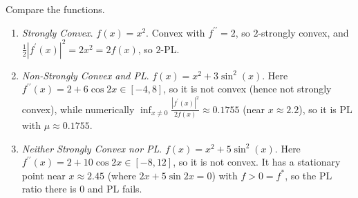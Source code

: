	\begin{example}
	  \label{ex:pl-vs-strongly-convex} 
		Compare the functions. 
		\begin{enumerate}
		  \item \textit{Strongly Convex}. $f(x) = x^2$. Convex with $f^{\prime\prime} = 2$, so $2$-strongly convex, and $\frac{1}{2}|f^\prime(x)|^2 = 2x^2 = 2 f(x)$, so $2$-PL. 
			\item \textit{Non-Strongly Convex and PL}. $f(x) = x^2 + 3 \sin^2 (x)$. \cite{DBLP:journals/corr/KarimiNS16} Here $f^{\prime\prime}(x) = 2 + 6\cos 2x \in [-4, 8]$, so it is not convex (hence not strongly convex), while numerically $\inf_{x \neq 0}\frac{|f^\prime(x)|^2}{2 f(x)} \approx 0.1755$ (near $x \approx 2.2$), so it is PL with $\mu \approx 0.1755$.
			\item \textit{Neither Strongly Convex nor PL}. $f(x) = x^2 + 5 \sin^2 (x)$. Here $f^{\prime\prime}(x) = 2 + 10\cos 2x \in [-8, 12]$, so it is not convex. It has a stationary point near $x \approx 2.45$ (where $2x + 5\sin 2x = 0$) with $f > 0 = f^\ast$, so the PL ratio there is $0$ and PL fails. 
		\end{enumerate}


\end{example}
